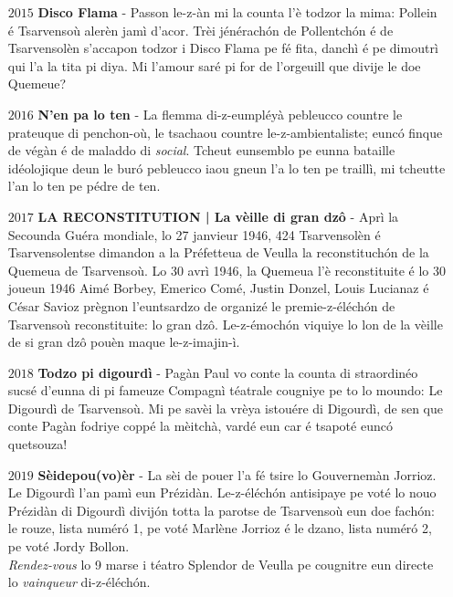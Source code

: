 \begin{itemize}
\item[$2015$] \textbf{Disco Flama} - Passon le-z-àn mi la counta l'è todzor la mima: Pollein é Tsarvensoù alerèn jamì d'acor. Trèi jénérach\'on de Pollentch\'on é de Tsarvensolèn s'accapon todzor i Disco Flama pe fé fita, danchì é pe dimoutrì qui l'a la tita pi diya. Mi l'amour saré pi for de l'orgeuill que divije le doe Quemeue? \newline

\item[$2016$] \textbf{N'en pa lo ten} - La flemma di-z-eumpléyà pebleucco countre le prateuque di penchon-où, le tsachaou countre le-z-ambientaliste; eunc\'o finque de végàn é de maladdo di \textit{social}. Tcheut eunsemblo pe eunna bataille idéolojique deun le bur\'o pebleucco iaou gneun l'a lo ten pe traillì, mi tcheutte l'an lo ten pe pédre de ten.\newline

\item[$2017$] \textbf{LA RECONSTITUTION | La vèille di gran dz\^{o}} - Aprì la Secounda Guéra mondiale, lo 27 janvieur 1946, 424 Tsarvensolèn é Tsarvensolentse dimandon a la Préfetteua de Veulla la reconstituch\'on de la Quemeua de Tsarvensoù. Lo 30 avrì 1946, la Quemeua l'è reconstituite é lo 30 joueun 1946 Aimé Borbey, Emerico Comé, Justin Donzel, Louis Lucianaz é César Savioz prègnon l'euntsardzo de organizé le premie-z-éléch\'on de Tsarvensoù reconstituite: lo gran dzô. Le-z-émoch\'on viquiye lo lon de la vèille de si gran dzô pouèn maque le-z-imajin-ì.\newline

\item[$2018$] \textbf{Todzo pi digourdì} - Pagàn Paul vo conte la counta di straordinéo sucsé d'eunna di pi fameuze Compagnì téatrale cougniye pe to lo moundo: Le Digourdì de Tsarvensoù. Mi pe savèi la vrèya istouére di Digourdì, de sen que conte Pagàn fodriye coppé la mèitchà, vardé eun car é tsapoté eunc\'o quetsouza!\newline

\item[$2019$] \textbf{Sèidepou(vo)èr} - La sèi de pouer l'a fé tsire lo Gouvernemàn Jorrioz. Le Digourdì l'an pamì eun Prézidàn. Le-z-éléch\'on antisipaye pe voté lo nouo Prézidàn di Digourdì divij\'on totta la parotse de Tsarvensoù eun doe fach\'on: le rouze, lista numér\'o 1, pe voté Marlène Jorrioz é le dzano, lista numér\'o 2, pe voté Jordy Bollon. \\\textit{Rendez-vous} lo 9 marse i téatro Splendor de Veulla pe cougnitre eun directe lo \textit{vainqueur} di-z-éléch\'on.

\end{itemize}